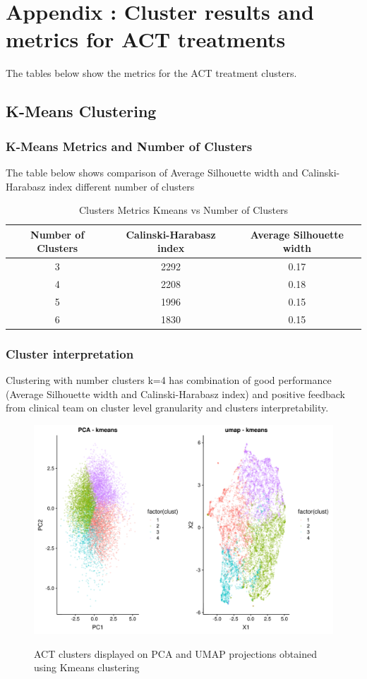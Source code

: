 \documentclass{article}
\begin{document}
\section{Appendix : Cluster results and metrics for ACT treatments}

The tables below show the metrics for the ACT treatment clusters.
\subsection{K-Means Clustering}
\subsubsection{K-Means Metrics and Number of Clusters}
The table below shows comparison of Average Silhouette width and Calinski-Harabasz index different number of clusters

\begin{table}[H]
  \caption{Clusters Metrics Kmeans vs Number of Clusters}
  \label{steps_metrics}
  \centering
  \begin{tabular}{ c|c|c}
    \toprule
    \cmidrule(r){1-2}
    Number of Clusters & Calinski-Harabasz index & Average Silhouette width \\
    \midrule
    3 & 2292 & 0.17 \\
    4 & 2208 & 0.18 \\
    5 & 1996 & 0.15 \\
    6 & 1830 & 0.15 \\
    \bottomrule
    \end{tabular}
\end{table}

\subsubsection{Cluster interpretation}
Clustering with number clusters k=4 has combination of good performance (Average Silhouette width and Calinski-Harabasz index) and positive feedback from clinical team on cluster level granularity and clusters interpretability. 

\begin{figure}
  \centering
  \caption{ACT clusters displayed on PCA and UMAP projections obtained using Kmeans clustering}
  \includegraphics[scale=0.5]{fig_ACT_4_clusters.png}
  \label{fig:figACT4clusters}
\end{figure}
\end{document}
